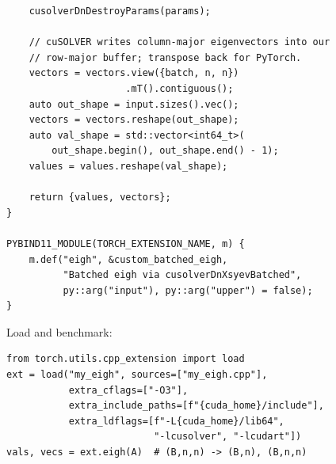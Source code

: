 \documentclass[10pt, letterpaper]{article}
\begin{document}
\begin{lstlisting}
    cusolverDnDestroyParams(params);

    // cuSOLVER writes column-major eigenvectors into our
    // row-major buffer; transpose back for PyTorch.
    vectors = vectors.view({batch, n, n})
                     .mT().contiguous();
    auto out_shape = input.sizes().vec();
    vectors = vectors.reshape(out_shape);
    auto val_shape = std::vector<int64_t>(
        out_shape.begin(), out_shape.end() - 1);
    values = values.reshape(val_shape);

    return {values, vectors};
}

PYBIND11_MODULE(TORCH_EXTENSION_NAME, m) {
    m.def("eigh", &custom_batched_eigh,
          "Batched eigh via cusolverDnXsyevBatched",
          py::arg("input"), py::arg("upper") = false);
}
\end{lstlisting}

Load and benchmark:
\begin{lstlisting}[style=python]
from torch.utils.cpp_extension import load
ext = load("my_eigh", sources=["my_eigh.cpp"],
           extra_cflags=["-O3"],
           extra_include_paths=[f"{cuda_home}/include"],
           extra_ldflags=[f"-L{cuda_home}/lib64",
                          "-lcusolver", "-lcudart"])
vals, vecs = ext.eigh(A)  # (B,n,n) -> (B,n), (B,n,n)
\end{lstlisting}
\end{document}
